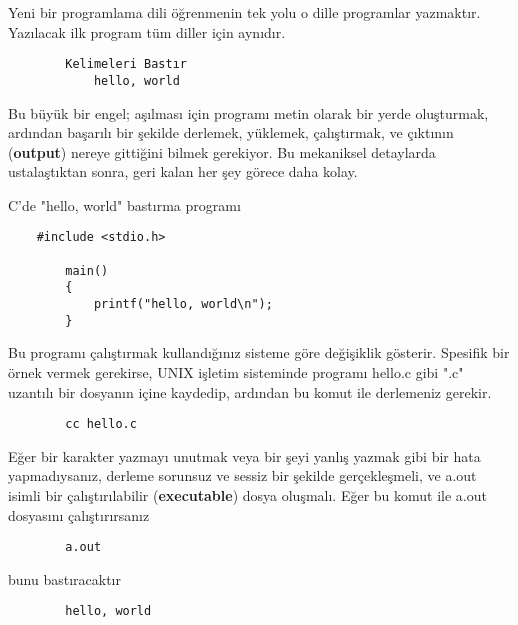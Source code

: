 \documentclass[a4paper,12pt,oneside]{book}
\begin{document}
Yeni bir programlama dili öğrenmenin tek yolu o dille programlar yazmaktır. Yazılacak ilk program tüm diller için aynıdır.
\begin{lstlisting}
		Kelimeleri Bastır
			hello, world
\end{lstlisting}
\par Bu büyük bir engel; aşılması için programı metin olarak bir yerde oluşturmak, ardından başarılı bir şekilde derlemek, yüklemek, çalıştırmak, ve çıktının (\textbf{output}) nereye gittiğini bilmek gerekiyor. Bu mekaniksel detaylarda ustalaştıktan sonra, geri kalan her şey görece daha kolay.
    \par C'de "hello, world" bastırma programı
\begin{lstlisting}
    #include <stdio.h>

        main()
        {
            printf("hello, world\n");
        }
\end{lstlisting}

Bu programı çalıştırmak kullandığınız sisteme göre değişiklik gösterir. Spesifik bir örnek vermek gerekirse, UNIX işletim sisteminde programı hello.c gibi ".c" uzantılı bir dosyanın içine kaydedip, ardından bu komut ile derlemeniz gerekir.
\begin{lstlisting}
		cc hello.c
\end{lstlisting}
Eğer bir karakter yazmayı unutmak veya bir şeyi yanlış yazmak gibi bir hata yapmadıysanız, derleme sorunsuz ve sessiz bir şekilde gerçekleşmeli, ve a.out isimli bir çalıştırılabilir (\textbf{executable}) dosya oluşmalı. Eğer bu komut ile a.out dosyasını çalıştırırsanız
\begin{lstlisting}
		a.out
\end{lstlisting}
bunu bastıracaktır
\begin{lstlisting}
		hello, world
\end{lstlisting}
\end{document}
